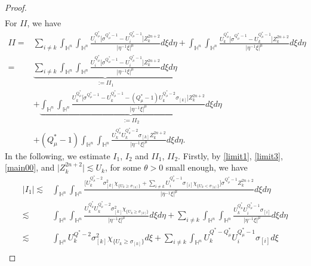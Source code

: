 \documentclass[11pt]{article}
\begin{document}
\begin{proof}
\begin{align}
\end{align}
For $II$,  we have
\begin{align}\label{main32}
  II=&\sum\limits_{i\neq k}\int_{\mathbb{H}^{n}}\int_{\mathbb{H}^{n}}\frac{U_i^{Q^{\ast}_{\mu}}\Big[\sigma^{Q^{\ast}_{\mu}-1}-U_i^{Q^{\ast}_{\mu}-1}\Big]Z_k^{2n+2}}
{|\eta^{-1}\xi|^{\mu}}d\xi{d}\eta+\int_{\mathbb{H}^{n}}\int_{\mathbb{H}^{n}}\frac{U_k^{Q^{\ast}_{\mu}}\Big[\sigma^{Q^{\ast}_{\mu}-1}-U_k^{Q^{\ast}_{\mu}-1}\Big]Z_k^{2n+2}}
{|\eta^{-1}\xi|^{\mu}}d\xi{d}\eta \nonumber\\
=&\underbrace{\sum\limits_{i\neq k}\int_{\mathbb{H}^{n}}\int_{\mathbb{H}^{n}}\frac{U_i^{Q^{\ast}_{\mu}}\Big[\sigma^{Q^{\ast}_{\mu}-1}-U_i^{Q^{\ast}_{\mu}-1}\Big]Z_k^{2n+2}}
{|\eta^{-1}\xi|^{\mu}}d\xi{d}\eta}_{:=II_{1}} \nonumber\\
&+\underbrace{\int_{\mathbb{H}^{n}}\int_{\mathbb{H}^{n}}\frac{U_k^{Q^{\ast}_{\mu}}
\Big[\sigma^{Q^{\ast}_{\mu}-1}-U_k^{Q^{\ast}_{\mu}-1}-(Q^{\ast}_{\mu}-1)U_k^{Q^{\ast}_{\mu}-2}\sigma_{[k]}\Big]Z_k^{2n+2}}
{|\eta^{-1}\xi|^{\mu}}d\xi{d}\eta}_{:=II_2} \nonumber\\
&+(Q^{\ast}_{\mu}-1)\int_{\mathbb{H}^{n}}\int_{\mathbb{H}^{n}}
\frac{U_k^{Q^{\ast}_{\mu}}U_k^{Q^{\ast}_{\mu}-2}\sigma_{[k]}Z_k^{2n+2}}
{|\eta^{-1}\xi|^{\mu}}d\xi{d}\eta.
\end{align}
In the following, we estimate $I_1$, $I_2$ and $II_1$, $II_2$. Firstly, by \eqref{limit1}, \eqref{limit3}, \eqref{main00}, and $\big|Z_k^{2n+2}\big| \lesssim U_k$, for some $\theta>0$ small enough, we have
\begin{align}\label{main33}
  |I_1|\lesssim& \int_{\mathbb{H}^{n}}\int_{\mathbb{H}^{n}}\frac{
  \Big[U_k^{Q^{\ast}_{\mu}-2}\sigma^2_{[k]}\chi_{\{U_k\geq \sigma_{[k]}\}}+\sum\limits_{i\neq k}U_i^{Q^{\ast}_{\mu}-1}\sigma_{[i]}\chi_{\{U_k< \sigma_{[k]}\}}\Big]\sigma^{Q^{\ast}_{\mu}-1}Z_k^{2n+2}}
{|\eta^{-1}\xi|^{\mu}}d\xi{d}\eta \nonumber\\
\lesssim& \int_{\mathbb{H}^{n}}\int_{\mathbb{H}^{n}}\frac{
U_k^{Q^{\ast}_{\mu}}U_k^{Q^{\ast}_{\mu}-2}\sigma^2_{[k]}\chi_{\{U_k\geq \sigma_{[k]}\}}}
{|\eta^{-1}\xi|^{\mu}}d\xi{d}\eta+\sum\limits_{i\neq k}\int_{\mathbb{H}^{n}}\int_{\mathbb{H}^{n}}\frac{
  U_k^{Q^{\ast}_{\mu}}U_i^{Q^{\ast}_{\mu}-1}\sigma_{[i]}
  }
{|\eta^{-1}\xi|^{\mu}}d\xi{d}\eta \nonumber\\
\lesssim& \int_{\mathbb{H}^{n}}U_k^{Q^{\ast}-2}\sigma^2_{[k]}\chi_{\{U_k\geq \sigma_{[k]}\}}d\xi +\sum\limits_{i\neq k}\int_{\mathbb{H}^{n}}U_k^{Q^{\ast}-Q_\mu^*}U_i^{Q^{\ast}_{\mu}-1}\sigma_{[i]}d\xi \nonumber\\

\end{align}
\end{proof}
\end{document}
